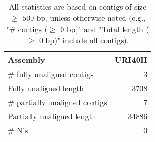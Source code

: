 \documentclass[12pt,a4paper]{article}
\begin{document}
\begin{table}[ht]
\begin{center}
\caption{All statistics are based on contigs of size $\geq$ 500 bp, unless otherwise noted (e.g., "\# contigs ($\geq$ 0 bp)" and "Total length ($\geq$ 0 bp)" include all contigs).}
\begin{tabular}{|l*{1}{|r}|}
\hline
Assembly & URI40H \\ \hline
\# fully unaligned contigs & 3 \\ \hline
Fully unaligned length & 3708 \\ \hline
\# partially unaligned contigs & 7 \\ \hline
Partially unaligned length & 34886 \\ \hline
\# N's & 0 \\ \hline
\end{tabular}
\end{center}
\end{table}
\end{document}
